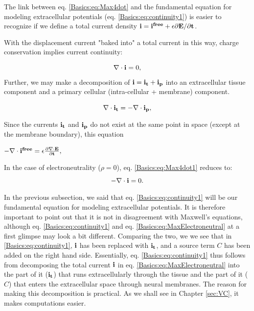 The link between eq. \ref{Basics:eq:Max4dot} and the fundamental equation for modeling extracellular potentials (eq. \ref{Basics:eq:continuity1}) is easier to recognize if we define a total current density ${\bf i} = \bf{i^{free}} +\epsilon\partial{\bf E}/\partial{t}$. 

With the displacement current "baked into" a total current in this way, charge conservation implies current continuity:

\begin{equation}
\nabla \cdot {\bf i} =  0,
\label{Basics:eq:Max4dot1}
\end{equation}
Further, we may make a decomposition of ${\bf i} = {\bf i_t} + {\bf i_p}$ into an extracellular tissue component and a primary cellular (intra-cellular + membrane) component. 

\begin{equation}
\nabla \cdot {\bf i_t} =  -\nabla \cdot {\bf i_p},
\label{Basics:eq:Max4dot1}
\end{equation}

Since the currents ${\bf i_t}$ and  ${\bf i_p}$ do not exist at the same point in space (except at the membrane boundary), this equation


$- \nabla \cdot \bf{i^{free}} =  \epsilon \frac{\partial {\bf \nabla \cdot E}}{\partial t}, $


In the case of electroneutrality ($\rho = 0$), eq. \ref{Basics:eq:Max4dot1} reduces to:
\begin{equation}
- \nabla \cdot {\bf i} =  0.
\label{Basics:eq:MaxElectroneutral}
\end{equation}


In the previous subsection, we said that eq. \ref{Basics:eq:continuity1} will be our fundamental equation for modeling extracellular potentials. It is therefore important to point out that it is not in disagreement with Maxwell's equations, although eq. \ref{Basics:eq:continuity1} and eq. \ref{Basics:eq:MaxElectroneutral} at a first glimpse may look a bit different. Comparing the two, we we see that in \ref{Basics:eq:continuity1}, ${\bf i}$ has been replaced with ${\bf i_t}$, and a source term $C$ has been added on the right hand side. Essentially, eq. \ref{Basics:eq:continuity1} thus follows from decomposing the total current ${\bf i}$ in eq. \ref{Basics:eq:MaxElectroneutral} into the part of it ($\bf{i_t}$) that runs extracellularly through the tissue and the part of it ($C$) that enters the extracellular space through neural membranes. The reason for making this decomposition is practical. As we shall see in Chapter \ref{sec:VC}, it makes computations easier.





